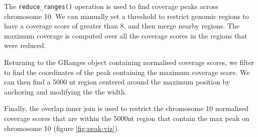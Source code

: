 \documentclass[10pt,letterpaper]{article}
\newenvironment{Shaded}{\begin{snugshade}}{\end{snugshade}}
\newcommand{\KeywordTok}[1]{\textcolor[rgb]{0.13,0.29,0.53}{\textbf{#1}}}
\newcommand{\DataTypeTok}[1]{\textcolor[rgb]{0.13,0.29,0.53}{#1}}
\newcommand{\DecValTok}[1]{\textcolor[rgb]{0.00,0.00,0.81}{#1}}
\newcommand{\StringTok}[1]{\textcolor[rgb]{0.31,0.60,0.02}{#1}}
\newcommand{\OperatorTok}[1]{\textcolor[rgb]{0.81,0.36,0.00}{\textbf{#1}}}
\newcommand{\NormalTok}[1]{#1}
\begin{document}
The \texttt{reduce\_ranges()} operation is used to find coverage peaks
across chromosome 10. We can manually set a threshold to restrict
genomic regions to have a coverage score of greater than 8, and then
merge nearby regions. The maximum coverage is computed over all the
coverage scores in the regions that were reduced.

\begin{Shaded}
\end{Shaded}

Returning to the GRanges object containing normalised coverage scores,
we filter to find the coordinates of the peak containing the maximum
coverage score. We can then find a 5000 nt region centered around the
maximum position by anchoring and modifying the the width.

\begin{Shaded}
\end{Shaded}

Finally, the overlap inner join is used to restrict the chromosome 10
normalised coverage scores that are within the 5000nt region that
contain the max peak on chromosome 10 (figure \ref{fig:peak-viz}).

\begin{Shaded}
\end{Shaded}
\end{document}
